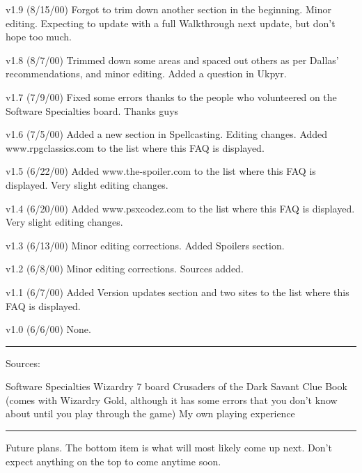 \documentclass[12pt]{article}
\begin{document}
v1.9 (8/15/00) Forgot to trim down another section in the beginning.
Minor editing. Expecting to update with a full Walkthrough next update,
but don't hope too much.

v1.8 (8/7/00) Trimmed down some areas and spaced out others as per
Dallas' recommendations, and minor editing. Added a question in Ukpyr.

v1.7 (7/9/00) Fixed some errors thanks to the people who volunteered on
the Software Specialties board. Thanks guys

v1.6 (7/5/00) Added a new section in Spellcasting. Editing changes.
Added www.rpgclassics.com to the list where this FAQ is displayed.

v1.5 (6/22/00) Added www.the-spoiler.com to the list where this FAQ is
displayed. Very slight editing changes.

v1.4 (6/20/00) Added www.psxcodez.com to the list where this FAQ is
displayed. Very slight editing changes.

v1.3 (6/13/00) Minor editing corrections. Added Spoilers section.

v1.2 (6/8/00) Minor editing corrections. Sources added.

v1.1 (6/7/00) Added Version updates section and two sites to the list
where this FAQ is displayed.

v1.0 (6/6/00) None.

\begin{center}\rule{0.5\linewidth}{\linethickness}\end{center}

Sources:

Software Specialties Wizardry 7 board Crusaders of the Dark Savant Clue
Book (comes with Wizardry Gold, although it has some errors that you
don't know about until you play through the game) My own playing
experience

\begin{center}\rule{0.5\linewidth}{\linethickness}\end{center}

Future plans. The bottom item is what will most likely come up next.
Don't expect anything on the top to come anytime soon.
\end{document}
